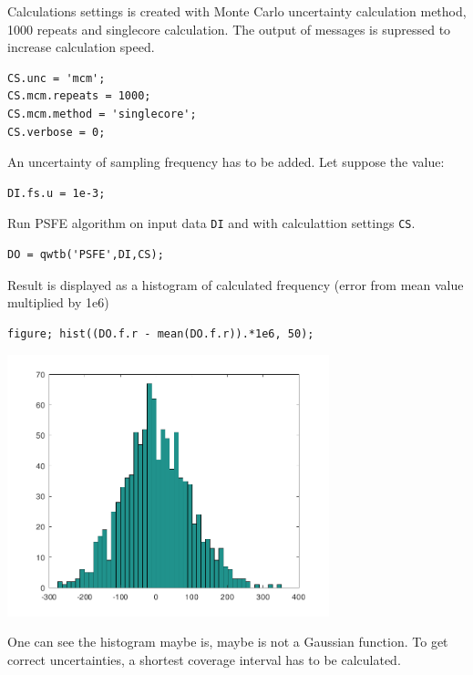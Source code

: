 Calculations settings is created with Monte Carlo uncertainty calculation
method, 1000 repeats and singlecore calculation. The output of messages is supressed to increase
calculation speed.

\begin{lstlisting}
CS.unc = 'mcm';
CS.mcm.repeats = 1000;
CS.mcm.method = 'singlecore';
CS.verbose = 0;
\end{lstlisting}


An uncertainty of sampling frequency has to be added. Let suppose the value:

\begin{lstlisting}
DI.fs.u = 1e-3;
\end{lstlisting}


Run PSFE algorithm on input data \texttt{DI} and with calculattion settings \texttt{CS}.

\begin{lstlisting}
DO = qwtb('PSFE',DI,CS);
\end{lstlisting}


Result is displayed as a histogram of calculated frequency (error from mean value multiplied by 1e6)

\begin{lstlisting}
figure; hist((DO.f.r - mean(DO.f.r)).*1e6, 50);
\end{lstlisting}
\begin{center}
\includegraphics[width=0.7\textwidth]{qwtb_examples_published/qwtb_example_1-2.pdf}
\end{center}


One can see the histogram maybe is, maybe is not a Gaussian function. To get
correct uncertainties, a shortest coverage interval has to be calculated.



\stopcontents[localtoc]
